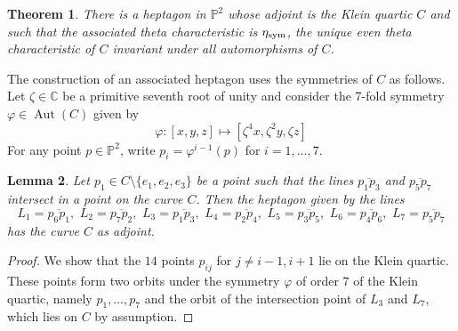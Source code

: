 \documentclass[12pt]{article}
\newtheorem{theorem}{Theorem}[section]
\newtheorem{lemma}[theorem]{Lemma}
\numberwithin{equation}{section}
\theoremstyle{definition}
\renewcommand{\P}{\mathbb{P}}
\newcommand{\etasym}{\eta_{\rm sym}}
\newcommand{\C}{\mathbb{C}}
\newcommand{\ol}{\overline}
\begin{document}
\begin{theorem}\label{KleinQuarticThetaHeptagon}
	There is a heptagon in $\P^2$ whose adjoint is the Klein quartic $C$ and such that the associated theta characteristic is $\etasym$, the unique even theta characteristic of $C$ invariant under all automorphisms of $C$.
\end{theorem}


The construction of an associated heptagon uses the symmetries of $C$ as follows. Let $\zeta \in \C$ be a primitive seventh root of unity and consider the 7-fold symmetry $\varphi \in \operatorname{Aut}(C)$ given by 
\[ \varphi : [x,y,z] \longmapsto [\zeta^4 x, \zeta^2 y, \zeta z] \] 
For any point $p \in \P^2$, write $p_i = \varphi^{i-1}(p)$ for $i=1,\dots,7$. 

\begin{lemma}\label{lemma:heptagonKlein}
Let $p_1\in C\setminus \{e_1,e_2,e_3\}$ be a point such that the lines $\ol{p_1 p_3}$ and $\ol{p_5 p_7}$ intersect in a point on the curve $C$. Then the heptagon given by the lines
\[ L_1 = \ol{p_6p_1},\,\, L_2 = \ol{p_7p_2}, \,\, L_3 = \ol{p_1p_3}, \,\, L_4 = \ol{p_2p_4}, \,\, L_5 = \ol{p_3p_5}, \,\, L_6 = \ol{p_4p_6}, \,\, L_7 = \ol{p_5p_7} \]
has the curve $C$ as adjoint.	
\end{lemma}
\begin{proof}
	We show that the $14$ points $p_{ij}$ for $j\neq i-1,i+1$ lie on the Klein quartic. These points form two orbits under the symmetry $\varphi$ of order $7$ of the Klein quartic, namely $p_1, \ldots,p_7$ and the orbit of the intersection point of $L_3$ and $L_7$, which lies on $C$ by assumption.
\end{proof} 
\end{document}
